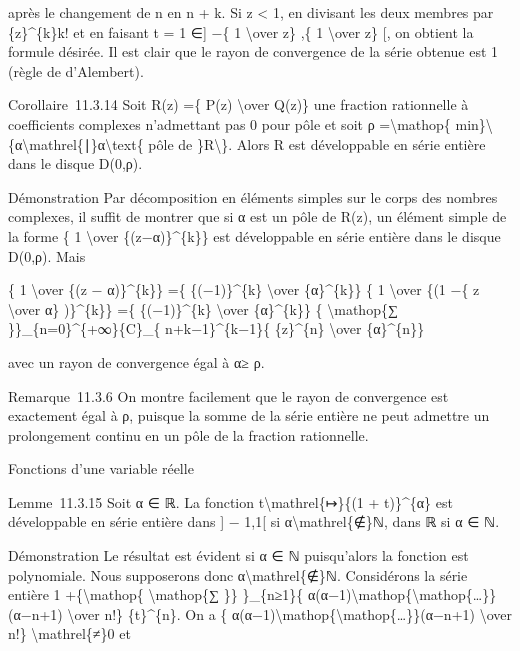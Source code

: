 \documentclass[]{article}
\begin{document}
après le changement de n en n + k. Si \textbar{}z\textbar{} \textless{}
1, en divisant les deux membres par \{z\}\^{}\{k\}k! et en faisant t = 1
∈{]} −\{ 1 \textbackslash{}over \textbar{}z\textbar{}\} ,\{ 1
\textbackslash{}over \textbar{}z\textbar{}\} {[}, on obtient la formule
désirée. Il est clair que le rayon de convergence de la série obtenue
est 1 (règle de d'Alembert).

Corollaire~11.3.14 Soit R(z) =\{ P(z) \textbackslash{}over Q(z)\} une
fraction rationnelle à coefficients complexes n'admettant pas 0 pour
pôle et soit ρ =\textbackslash{}mathop\{
min\}\textbackslash{}\{\textbar{}α\textbar{}\textbackslash{}mathrel\{∣\}α\textbackslash{}text\{
pôle de \}R\textbackslash{}\}. Alors R est développable en série entière
dans le disque D(0,ρ).

Démonstration Par décomposition en éléments simples sur le corps des
nombres complexes, il suffit de montrer que si α est un pôle de R(z), un
élément simple de la forme \{ 1 \textbackslash{}over
\{(z−α)\}\^{}\{k\}\} est développable en série entière dans le disque
D(0,ρ). Mais

\{ 1 \textbackslash{}over \{(z − α)\}\^{}\{k\}\} =\{ \{(−1)\}\^{}\{k\}
\textbackslash{}over \{α\}\^{}\{k\}\} \{ 1 \textbackslash{}over \{(1 −\{
z \textbackslash{}over α\} )\}\^{}\{k\}\} =\{ \{(−1)\}\^{}\{k\}
\textbackslash{}over \{α\}\^{}\{k\}\} \{ \textbackslash{}mathop\{∑
\}\}\_\{n=0\}\^{}\{+∞\}\{C\}\_\{ n+k−1\}\^{}\{k−1\}\{ \{z\}\^{}\{n\}
\textbackslash{}over \{α\}\^{}\{n\}\}

avec un rayon de convergence égal à \textbar{}α\textbar{}≥ ρ.

Remarque~11.3.6 On montre facilement que le rayon de convergence est
exactement égal à ρ, puisque la somme de la série entière ne peut
admettre un prolongement continu en un pôle de la fraction rationnelle.

Fonctions d'une variable réelle

Lemme~11.3.15 Soit α ∈ ℝ. La fonction t\textbackslash{}mathrel\{↦\}\{(1
+ t)\}\^{}\{α\} est développable en série entière dans {]} − 1,1{[} si
α\textbackslash{}mathrel\{∉\}ℕ, dans ℝ si α ∈ ℕ.

Démonstration Le résultat est évident si α ∈ ℕ puisqu'alors la fonction
est polynomiale. Nous supposerons donc α\textbackslash{}mathrel\{∉\}ℕ.
Considérons la série entière 1 +\{\textbackslash{}mathop\{
\textbackslash{}mathop\{∑ \}\} \}\_\{n≥1\}\{
α(α−1)\textbackslash{}mathop\{\textbackslash{}mathop\{\ldots{}\}\}(α−n+1)
\textbackslash{}over n!\} \{t\}\^{}\{n\}. On a \{
α(α−1)\textbackslash{}mathop\{\textbackslash{}mathop\{\ldots{}\}\}(α−n+1)
\textbackslash{}over n!\} \textbackslash{}mathrel\{≠\}0 et
\end{document}
